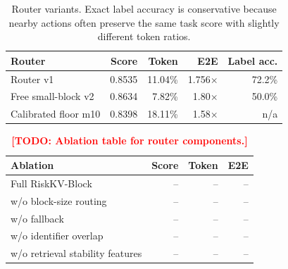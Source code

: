 \documentclass{article}
\newcommand{\todoexp}[1]{\textcolor{red}{\textbf{[TODO: #1]}}}
\newcommand{\method}{RiskKV-Block}
\begin{document}
\begin{table}[h]
\centering
\caption{Router variants. Exact label accuracy is conservative because nearby actions often preserve the same task score with slightly different token ratios.}
\begin{tabular}{lrrrr}
\toprule
Router & Score & Token & E2E & Label acc. \\
\midrule
Router v1 & 0.8535 & 11.04\% & 1.756$\times$ & 72.2\% \\
Free small-block v2 & 0.8634 & 7.82\% & 1.80$\times$ & 50.0\% \\
Calibrated floor m10 & 0.8398 & 18.11\% & 1.58$\times$ & n/a \\
\bottomrule
\end{tabular}
\end{table}

\begin{table}[h]
\centering
\caption{\todoexp{Ablation table for router components.}}
\begin{tabular}{lrrr}
\toprule
Ablation & Score & Token & E2E \\
\midrule
Full \method & -- & -- & -- \\
w/o block-size routing & -- & -- & -- \\
w/o fallback & -- & -- & -- \\
w/o identifier overlap & -- & -- & -- \\
w/o retrieval stability features & -- & -- & -- \\
\bottomrule
\end{tabular}
\end{table}
\end{document}
